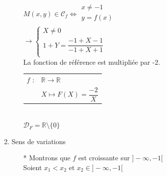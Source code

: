 \begin{enumerate}
\begin{itemize}
$M(x, y) \in \mathcal{C}_f \Longleftrightarrow \begin{array}{c}
                                                  x \neq -1\\
                                                  y = f(x)\\
                                                \end{array} $ \\
                                                
$\rightarrow \begin{cases}
                X \neq 0 \\
                1 + Y = \dfrac{-1 +X -1}{-1 + X +1}\\
             \end{cases}$ \\
             
La fonction de référence est multipliée par -2.\\


\begin{tabular}{l@{$\;$ }l}
  $f$ : & $ \mathbb{R} \longrightarrow \mathbb{R}$  \\
        & $ X \longmapsto F(X) = \dfrac{-2}{X}$ \\
\end{tabular}\\

$ \mathscr{D}_F = \mathbb{R}\setminus\!\!\{0\}$ \\
                    

\end{itemize}
\newpage     
 
\item Sens de variations


\begin{itemize}

\item [*] Montrons que $f$ est croissante sur $]-\infty, -1[$ \\

Soient $x_1 < x_2$   et  $x_2 \in ] -\infty, -1[$ \\


\end{itemize}
\end{enumerate}

